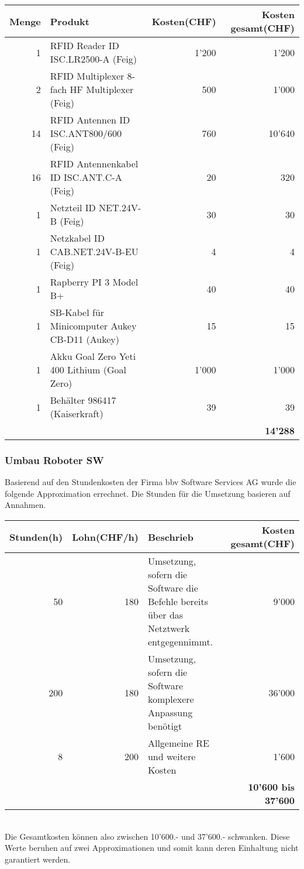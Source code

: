 \begin{tabularx}{\textwidth}{|r|X|r|r|}
	\hline 
	\textbf{Menge} & \textbf{Produkt} & \textbf{Kosten(CHF)} & \textbf{Kosten gesamt(CHF)} \\
	\hline 
	1 & RFID Reader ID ISC.LR2500-A (Feig) & 1'200 & 1'200 \\ 
	\hline 
	2 & RFID Multiplexer 8-fach HF Multiplexer (Feig) & 500 & 1'000 \\ 
	\hline 
	14 & RFID Antennen ID ISC.ANT800/600 (Feig)& 760 & 10'640 \\
	\hline
	16 & RFID Antennenkabel ID ISC.ANT.C-A (Feig) & 20 & 320 \\
	\hline
	1 & Netzteil ID NET.24V-B (Feig) & 30 & 30 \\
	\hline
	1 & Netzkabel ID CAB.NET.24V-B-EU (Feig) & 4 & 4 \\
	\hline
	1 & Rapberry PI 3 Model B+ & 40 & 40 \\
	\hline
	1 & SB-Kabel für Minicomputer Aukey CB-D11 (Aukey) & 15 & 15 \\
	\hline
	1 & Akku Goal Zero Yeti 400 Lithium (Goal Zero) & 1'000 & 1'000 \\
	\hline
	1 & Behälter 986417 (Kaiserkraft) & 39 & 39 \\
	\hline
	& & & \textbf{14'288} \\
	\hline
\end{tabularx} 
\subsubsection{Umbau Roboter SW}
Basierend auf den Stundenkosten der Firma bbv Software Services AG wurde die folgende Approximation errechnet.
Die Stunden für die Umsetzung basieren auf Annahmen.

\begin{tabularx}{\textwidth}{|r|r|X|r|}
	\hline 
	\textbf{Stunden(h)} & \textbf{Lohn(CHF/h)} & \textbf{Beschrieb} & \textbf{Kosten gesamt(CHF)} \\
	\hline 
	50 & 180 & Umsetzung, sofern die Software die Befehle bereits über das Netztwerk entgegennimmt. & 9'000 \\
	\hline
	200 & 180 & Umsetzung, sofern die Software komplexere Anpassung benötigt & 36'000 \\
	\hline
	8 & 200 & Allgemeine RE und weitere Kosten & 1'600 \\
	\hline	
	& & & \textbf{10'600 bis 37'600} \\ 
	\hline
\end{tabularx}
\\
Die Gesamtkosten können also zwischen 10'600.- und 37'600.- schwanken. Diese Werte beruhen auf zwei Approximationen und somit kann deren Einhaltung nicht garantiert werden.

